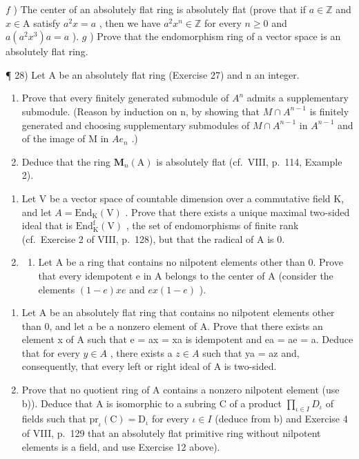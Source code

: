 \(f\) ) The center of an absolutely flat ring is absolutely flat (prove that if \(a \in \mathbb{Z}\) and \(x \in \mathrm{A}\) satisfy \(a^2 x = a\) , then we have \(a^2 x^n \in \mathbb{Z}\) for every \(n \geqslant 0\) and \(a(a^2 x^3)a = a\) ). \(g\) ) Prove that the endomorphism ring of a vector space is an absolutely flat ring.

¶ 28) Let A be an absolutely flat ring (Exercise 27) and n an integer.

\begin{enumerate}
\def\labelenumi{\alph{enumi})}
\item
  Prove that every finitely generated submodule of \(A^{n}\) admits a supplementary submodule. (Reason by induction on n, by showing that \(M \cap A^{n-1}\) is finitely generated and choosing supplementary submodules of \(M \cap A^{n-1}\) in \(A^{n-1}\) and of the image of M in \(Ae_{n}\) .)
\item
  Deduce that the ring \(\mathbf{M}_n(\mathrm{A})\) is absolutely flat (cf.~VIII, p.~114, Example 2).
\end{enumerate}

\begin{enumerate}
\def\labelenumi{\arabic{enumi})}
\setcounter{enumi}{28}
\item
  Let V be a vector space of countable dimension over a commutative field K, and let \(A = \text{End}_{\text{K}}(\text{V})\) . Prove that there exists a unique maximal two-sided ideal that is \(\text{End}_{\text{K}}^{\text{f}}(\text{V})\) , the set of endomorphisms of finite rank (cf.~Exercise 2 of VIII, p.~128), but that the radical of A is 0.
\item
  \begin{enumerate}
  \def\labelenumii{\alph{enumii})}
  \tightlist
  \item
    Let A be a ring that contains no nilpotent elements other than 0. Prove that every idempotent e in A belongs to the center of A (consider the elements \((1-e)xe\) and \(ex(1-e)\) ).
  \end{enumerate}
\end{enumerate}

\begin{enumerate}
\def\labelenumi{\alph{enumi})}
\setcounter{enumi}{1}
\item
  Let A be an absolutely flat ring that contains no nilpotent elements other than 0, and let a be a nonzero element of A. Prove that there exists an element x of A such that e = ax = xa is idempotent and ea = ae = a. Deduce that for every \(y \in A\) , there exists a \(z \in A\) such that ya = az and, consequently, that every left or right ideal of A is two-sided.
\item
  Prove that no quotient ring of A contains a nonzero nilpotent element (use b)). Deduce that A is isomorphic to a subring C of a product \(\prod_{\iota\in I}D_{\iota}\) of fields such that \(\mathrm{pr}_{\iota}(\mathrm{C})=\mathrm{D}_{\iota}\) for every \(\iota\in I\) (deduce from b) and Exercise 4 of VIII, p.~129 that an absolutely flat primitive ring without nilpotent elements is a field, and use Exercise 12 above).
\end{enumerate}

